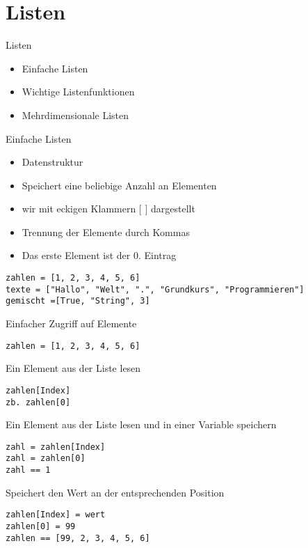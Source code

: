 \section{Listen}

\begin{frame}[fragile]{Listen}
\begin{itemize}
	\item Einfache Listen
	\item Wichtige Listenfunktionen
	\item Mehrdimensionale Listen
\end{itemize}
\end{frame}

\begin{frame}[fragile]{Einfache Listen}
	\begin{itemize}
		\item Datenstruktur
		\item Speichert eine beliebige Anzahl an Elementen
		\item wir mit eckigen Klammern $[$ $]$ dargestellt
		\item Trennung der Elemente durch Kommas
		\item Das erste Element ist der 0. Eintrag 
		
	\end{itemize}
\begin{lstlisting}
zahlen = [1, 2, 3, 4, 5, 6]
texte = ["Hallo", "Welt", ".", "Grundkurs", "Programmieren"]
gemischt =[True, "String", 3]
\end{lstlisting}
\end{frame}

\begin{frame}[fragile]{Einfacher Zugriff auf Elemente}
\begin{lstlisting}
zahlen = [1, 2, 3, 4, 5, 6]
\end{lstlisting}
Ein Element aus der Liste lesen
\begin{lstlisting}
zahlen[Index]
zb. zahlen[0]
\end{lstlisting}

Ein Element aus der Liste lesen und in einer Variable speichern
\begin{lstlisting}
zahl = zahlen[Index]
zahl = zahlen[0]
zahl == 1
\end{lstlisting}

Speichert den Wert an der entsprechenden Position
\begin{lstlisting}
zahlen[Index] = wert
zahlen[0] = 99
zahlen == [99, 2, 3, 4, 5, 6]
\end{lstlisting}

\end{frame}

